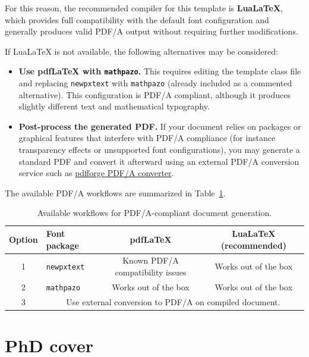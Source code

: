 For this reason, the recommended compiler for this template is \textbf{LuaLaTeX}, which provides full compatibility with the default font configuration and generally produces valid PDF/A output without requiring further modifications.

If LuaLaTeX is not available, the following alternatives may be considered:

\begin{itemize}
    \item \textbf{Use pdfLaTeX with \texttt{mathpazo}.}  
    This requires editing the template class file and replacing \verb|newpxtext| with \verb|mathpazo| (already included as a commented alternative). This configuration is PDF/A compliant, although it produces slightly different text and mathematical typography.

    \item \textbf{Post-process the generated PDF.}  
    If your document relies on packages or graphical features that interfere with PDF/A compliance (for instance transparency effects or unsupported font configurations), you may generate a standard PDF and convert it afterward using an external PDF/A conversion service such as
    \href{https://www.pdfforge.org/online/en/pdf-to-pdfa}{pdfforge PDF/A converter}.
\end{itemize}

The available PDF/A workflows are summarized in Table~\ref{tab:pdfa}.

\begin{table}[h!]
\small
\centering
\def\arraystretch{1.4}
\begin{tabular}{c|p{2.8cm}|c|c}\hline
\textbf{Option} & \textbf{Font package} & \textbf{pdfLaTeX} & \textbf{LuaLaTeX (recommended)} \\
\hline\hline
1 & \verb|newpxtext| 
& Known PDF/A compatibility issues 
& Works out of the box \\
\hline
2 & \verb|mathpazo| 
& Works out of the box 
& Works out of the box \\
\hline
3 & \multicolumn{3}{c}{Use external conversion to PDF/A on compiled document.}\\
\hline
\end{tabular}
\caption{\label{tab:pdfa}Available workflows for PDF/A-compliant document generation.}
\end{table}


\section{PhD cover}\label{sec:phdcover}

